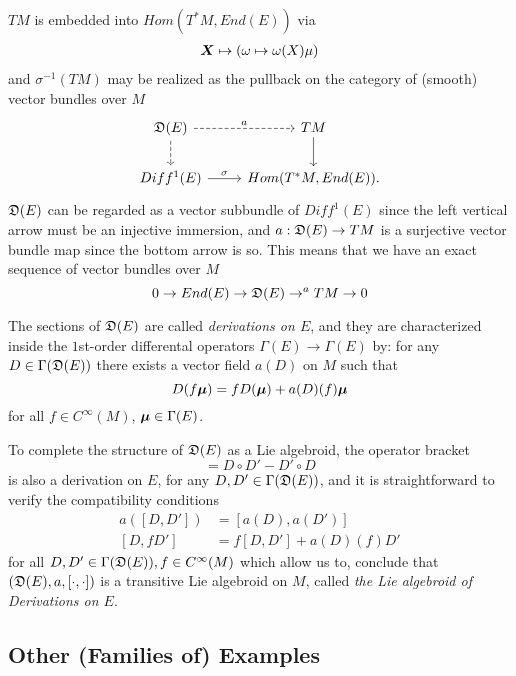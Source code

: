 $TM$ is embedded into $Hom(T^*M, End(E))$ via
\begin{align*}
    \bm{X} \mapsto (\omega \mapsto \omega(X) \mu)
\end{align*}
and $\sigma^{-1}(TM)$ may be realized as the pullback on the category of (smooth) vector bundles over $M$
\begin{equation*}
    \begin{tikzcd}
        \alg D(E) \arrow[dashed]{r}{a} \arrow[dashed]{d} & TM  \arrow{d}\\
        Diff^1(E) \arrow{r}{\sigma} & Hom(T^*M, End(E)).
    \end{tikzcd}
\end{equation*}
$\mathfrak{D}(E)$ can be regarded as a vector subbundle of $Diff^1(E)$ since the left vertical arrow must be an injective immersion, and $a: \mathfrak{D}(E) \to TM$ is a surjective vector bundle map since the bottom arrow is so. This means that we have an exact sequence of vector bundles over $M$
\begin{equation}
        0 \rightarrow End(E) \rightarrow \mathfrak{D}(E) \rightarrow^a TM \rightarrow 0
\end{equation}

The sections of $\mathfrak{D}(E)$ are called \emph{derivations on $E$}, and they are characterized inside the $1$st-order differental operators $\Gamma(E) \to \Gamma(E)$ by: for any $D \in \Gamma(\mathfrak{D}(E))$ there exists a vector field $a(D)$ on $M$ such that
\begin{equation}
    D(f \bm{\mu}) = f D(\bm{\mu}) + a(D)(f) \bm{\mu}
\end{equation}
for all $f \in C^\infty(M)$, $\bm{\mu} \in \Gamma(E)$.

To complete the structure of $\mathfrak{D}(E)$ as a Lie algebroid, the operator bracket
\begin{equation*}
    [D, D'] = D \circ D' - D' \circ D
\end{equation*}
is also a derivation on $E$, for any $D, D' \in \Gamma(\mathfrak{D}(E))$, and it is straightforward to verify the compatibility conditions
\begin{align}
    a([D, D']) &= [a(D), a(D')] \\
    [D, f D'] &= f[D, D'] + a(D)(f) D'
\end{align}
for all $D, D' \in \Gamma(\mathfrak{D}(E)), f \in C^\infty(M)$ which allow us to, conclude that $(\mathfrak{D}(E), a, [\cdot, \cdot])$ is a transitive Lie algebroid on $M$, called \emph{the Lie algebroid of Derivations on $E$}.

\subsection{Other (Families of) Examples}

